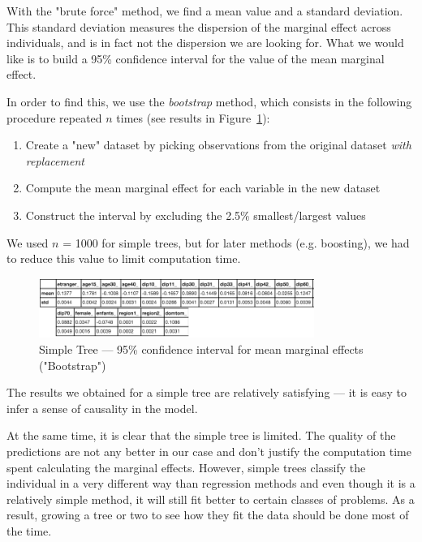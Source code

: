 With the "brute force" method, we find a mean value and a standard deviation. This standard deviation measures the dispersion of the marginal effect across individuals, and is in fact not the dispersion we are looking for. What we would like is to build a 95\% confidence interval for the value of the mean marginal effect.

In order to find this, we use the \textit{bootstrap} method, which consists in the following procedure repeated $n$ times (see results in Figure~\ref{fig:simple_tree_bootstrap}):

\begin{enumerate}
    \item Create a "new" dataset by picking observations from the original dataset \textit{with replacement}
    \item Compute the mean marginal effect for each variable in the new dataset
    \item Construct the interval by excluding the 2.5\% smallest/largest values
\end{enumerate}

We used $n$ = 1000 for simple trees, but for later methods (e.g. boosting), we had to reduce this value to limit computation time.

\begin{figure}
    \centering
    \includegraphics[width=0.8\textwidth]{img/simple_tree_bootstrap.png}
    \caption{Simple Tree --- 95\% confidence interval for mean marginal effects ("Bootstrap")}
    \label{fig:simple_tree_bootstrap}
\end{figure}

The results we obtained for a simple tree are relatively satisfying --- it is easy to infer a sense of causality in the model.

At the same time, it is clear that the simple tree is limited. The quality of the predictions are not any better in our case and don't justify the computation time spent calculating the marginal effects. However, simple trees classify the individual in a very different way than regression methods and even though it is a relatively simple method, it will still fit better to certain classes of problems. As a result, growing a tree or two to see how they fit the data should be done most of the time.

